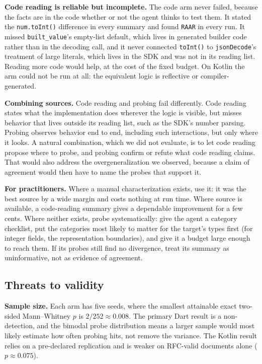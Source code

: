 \textbf{Code reading is reliable but incomplete.} The code arm never failed,
because the facts are in the code whether or not the agent thinks to test
them. It stated the \texttt{num.toInt()} difference in every summary and
found \texttt{RAAR} in every run. It missed \texttt{built\_value}'s
empty-list default, which lives in generated builder code rather than in
the decoding call, and it never connected \texttt{toInt()} to
\texttt{jsonDecode}'s treatment of large literals, which lives in the SDK and
was not in its reading list. Reading more code would help, at the cost of the
fixed budget. On Kotlin the arm could not be run at all: the equivalent logic
is reflective or compiler-generated.

\textbf{Combining sources.} Code reading and probing fail differently. Code
reading states what the implementation does wherever the logic is visible,
but misses behavior that lives outside its reading list, such as the SDK's
number parsing. Probing observes behavior end to end, including such
interactions, but only where it looks. A natural combination, which we did
not evaluate, is to let code reading propose where to probe, and probing
confirm or refute what code reading claims. That would also address the
overgeneralization we observed, because a claim of agreement would then have
to name the probes that support it.

\textbf{For practitioners.} Where a manual characterization exists, use it:
it was the best source by a wide margin and costs nothing at run time. Where
source is available, a code-reading summary gives a dependable improvement
for a few cents. Where neither exists, probe systematically: give the
agent a category checklist, put the categories most likely to matter for the
target's types first (for integer fields, the representation boundaries),
and give it a budget large enough to reach them. If its probes still find no
divergence, treat its summary as uninformative, not as evidence of
agreement.

\subsection{Threats to validity}

\textbf{Sample size.} Each arm has five seeds, where the smallest attainable
exact two-sided Mann--Whitney $p$ is $2/252 \approx 0.008$. The primary Dart result is a
non-detection, and the bimodal probe distribution means a larger sample
would most likely estimate how often probing hits, not remove the
variance. The Kotlin result relies on a pre-declared replication and is
weaker on RFC-valid documents alone ($p \approx 0.075$).

